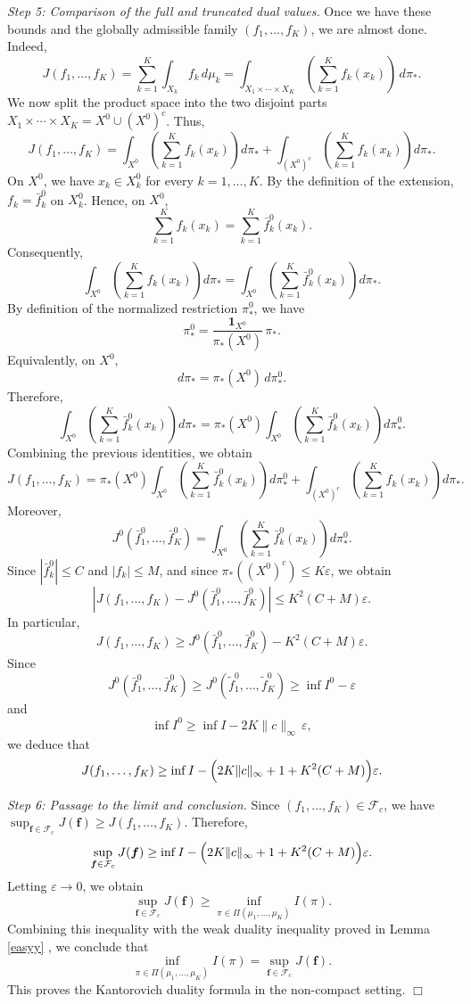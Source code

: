 \documentclass[twoside,11pt,a4paper]{article}
\newcommand*{\SavedRef}{}
\let\SavedRef\ref
\renewcommand*{\ref}[1]{  \begingroup
    \hypersetup{
      linkcolor=linkequation,
      linkbordercolor=linkequation,
    }    \SavedRef{#1}  \endgroup
}
\begin{document}
\medskip
\noindent\emph{Step 5: Comparison of the full and truncated dual values.}
Once we have these bounds and the globally admissible family
\((f_1,\ldots,f_K)\), we are almost done. Indeed,
\[
J(f_1,\ldots,f_K)
=
\sum_{k=1}^K \int_{X_k} f_k\,d\mu_k
=
\int_{X_1\times\cdots\times X_K}
\left(\sum_{k=1}^K f_k(x_k)\right)\,d\pi_* .
\]
We now split the product space into the two disjoint parts $
X_1\times\cdots\times X_K
=
X^0\cup (X^0)^c$.
Thus,
\[
J(f_1,\ldots,f_K)
=
\int_{X^0}
\left(\sum_{k=1}^K f_k(x_k)\right)d\pi_*
+
\int_{(X^0)^c}
\left(\sum_{k=1}^K f_k(x_k)\right)d\pi_*.
\]
On \(X^0\), we have \(x_k\in X_k^0\) for every \(k=1,\ldots,K\). By the
definition of the extension, \(f_k=\bar f_k^0\) on \(X_k^0\). Hence, on \(X^0\),
\[
\sum_{k=1}^K f_k(x_k)
=
\sum_{k=1}^K \bar f_k^0(x_k).
\]
Consequently,
\[
\int_{X^0}
\left(\sum_{k=1}^K f_k(x_k)\right)d\pi_*
=
\int_{X^0}
\left(\sum_{k=1}^K \bar f_k^0(x_k)\right)d\pi_*.
\]
By definition of the normalized restriction \(\pi_*^0\), we have
\[
\pi_*^0
=
\frac{\mathbf 1_{X^0}}{\pi_*(X^0)}\,\pi_*.
\]
Equivalently, on \(X^0\),
\[
d\pi_*=\pi_*(X^0)\,d\pi_*^0.
\]
Therefore,
\[
\int_{X^0}
\left(\sum_{k=1}^K \bar f_k^0(x_k)\right)d\pi_*
=
\pi_*(X^0)
\int_{X^0}
\left(\sum_{k=1}^K \bar f_k^0(x_k)\right)d\pi_*^0.
\]
Combining the previous identities, we obtain
\[
J(f_1,\ldots,f_K)
=
\pi_*(X^0)
\int_{X^0}
\left(\sum_{k=1}^K \bar f_k^0(x_k)\right)d\pi_*^0
+
\int_{(X^0)^c}
\left(\sum_{k=1}^K f_k(x_k)\right)d\pi_* .
\]
Moreover,
\[
J^0(\bar f_1^0,\ldots,\bar f_K^0)
=
\int_{X^0}
\left(\sum_{k=1}^K \bar f_k^0(x_k)\right)d\pi_*^0 .
\]
Since \(|\bar f_k^0|\le C\) and \(|f_k|\le M\), and since
\(\pi_*((X^0)^c)\le K\varepsilon\), we obtain
\[
\left|
J(f_1,\ldots,f_K)
-
J^0(\bar f_1^0,\ldots,\bar f_K^0)
\right|
\le
K^2(C+M)\varepsilon .
\]
In particular,
\[
J(f_1,\ldots,f_K)
\ge
J^0(\bar f_1^0,\ldots,\bar f_K^0)
-
K^2(C+M)\varepsilon .
\]
Since
\[
J^0(\bar f_1^0,\ldots,\bar f_K^0)
\ge
J^0(\widetilde f_1^0,\ldots,\widetilde f_K^0)
\ge
\inf I^0-\varepsilon
\]
and
\[
\inf I^0
\ge
\inf I-2K\|c\|_\infty\,\varepsilon,
\]
we deduce that
\[
J(f_1,\ldots,f_K)
\ge
\inf I
-
\Bigl(2K\|c\|_\infty+1+K^2(C+M)\Bigr)\varepsilon .
\]

\medskip
\noindent\emph{Step 6: Passage to the limit and conclusion.}
Since \((f_1,\ldots,f_K)\in\mathcal F_c\), we have $
\sup_{\boldsymbol f\in\mathcal F_c}J(\boldsymbol f)
\ge
J(f_1,\ldots,f_K)$.
Therefore,
\[
\sup_{\boldsymbol f\in\mathcal F_c}J(\boldsymbol f)
\ge
\inf I
-
\Bigl(2K\|c\|_\infty+1+K^2(C+M)\Bigr)\varepsilon .
\]
Letting \(\varepsilon\to0\), we obtain
\[
\sup_{\boldsymbol f\in\mathcal F_c}J(\boldsymbol f)
\ge
\inf_{\pi\in\Pi(\mu_1,\ldots,\mu_K)} I(\pi).
\]
Combining this inequality with the weak duality inequality proved in
Lemma~\ref{easyy}, we conclude that
\[
\inf_{\pi\in\Pi(\mu_1,\ldots,\mu_K)} I(\pi)
=
\sup_{\boldsymbol f\in\mathcal F_c}J(\boldsymbol f).
\]
This proves the Kantorovich duality formula in the non-compact setting.
\hfill\(\Box\)
\end{document}
